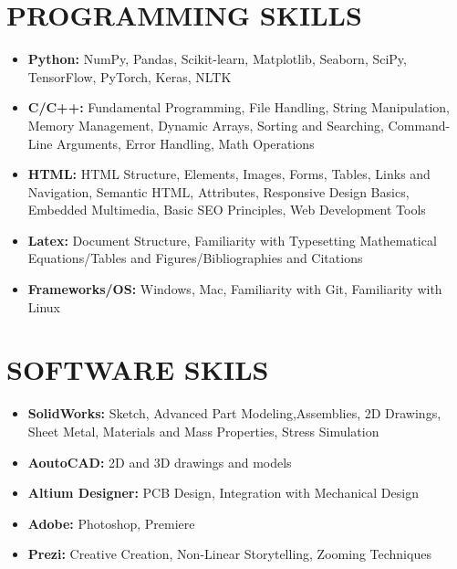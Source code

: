 \documentclass[letterpaper,11pt]{article}
\newcommand{\resumeSubHeadingListStart}{\begin{itemize}[leftmargin=*]}
\newcommand{\resumeSubHeadingListEnd}{\end{itemize}}
\begin{document}
\section{PROGRAMMING SKILLS}
    \resumeSubHeadingListStart
        \item{
            \textbf{Python: }{NumPy, Pandas, Scikit-learn, Matplotlib, Seaborn, SciPy, TensorFlow, PyTorch, Keras, NLTK}
        }\vspace{-5pt}
        \item{
            \textbf{C/C++: }{Fundamental Programming, File Handling, String Manipulation, Memory Management, Dynamic Arrays, Sorting and Searching, Command-Line Arguments, Error Handling, Math Operations}
        }\vspace{-5pt}
        \item{
            \textbf{HTML: }{HTML Structure, Elements, Images, Forms, Tables, Links and Navigation, Semantic HTML, Attributes, Responsive Design Basics, Embedded Multimedia, Basic SEO Principles, Web Development Tools}
        }\vspace{-5pt}
        \item{
            \textbf{Latex: }{Document Structure, Familiarity with Typesetting Mathematical Equations/Tables and Figures/Bibliographies and Citations}
        }\vspace{-5pt}
        \item{
            \textbf{Frameworks/OS: }{Windows, Mac, Familiarity with Git, Familiarity with Linux}
        }
    \resumeSubHeadingListEnd

\section{SOFTWARE SKILS}
    \resumeSubHeadingListStart
        \item{
            \textbf{SolidWorks: }{Sketch, Advanced Part Modeling,Assemblies, 2D Drawings, Sheet Metal, Materials and Mass Properties, Stress Simulation}
        }\vspace{-5pt}
        \item{
            \textbf{AoutoCAD: }{2D and 3D drawings and models} 
        }\vspace{-5pt}
        \item{
            \textbf{Altium Designer: }{PCB Design, Integration with Mechanical Design} 
        }\vspace{-5pt}
        \item{
            \textbf{Adobe: }{Photoshop, Premiere}
        }\vspace{-5pt}
        \item{
            \textbf{Prezi: }{Creative Creation, Non-Linear Storytelling, Zooming Techniques}
        }
    \resumeSubHeadingListEnd
    
\end{document}
